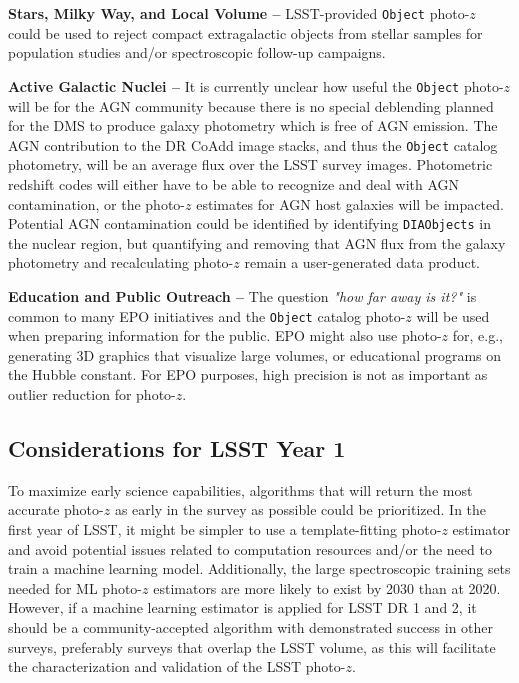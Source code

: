 \documentclass[DM,lsstdraft,toc]{lsstdoc}
\begin{document}
{\bf Stars, Milky Way, and Local Volume --} LSST-provided {\tt Object} photo-$z$ could be used to reject compact extragalactic objects from stellar samples for population studies and/or spectroscopic follow-up campaigns.

{\bf Active Galactic Nuclei --} It is currently unclear how useful the {\tt Object} photo-$z$ will be for the AGN community because there is no special deblending planned for the DMS to produce galaxy photometry which is free of AGN emission.
The AGN contribution to the DR CoAdd image stacks, and thus the {\tt Object} catalog photometry, will be an average flux over the LSST survey images.
Photometric redshift codes will either have to be able to recognize and deal with AGN contamination, or the photo-$z$ estimates for AGN host galaxies will be impacted.
Potential AGN contamination could be identified by identifying {\tt DIAObjects} in the nuclear region, but quantifying and removing that AGN flux from the galaxy photometry and recalculating photo-$z$ remain a user-generated data product.

{\bf Education and Public Outreach --} The question {\it "how far away is it?"} is common to many EPO initiatives and the {\tt Object} catalog photo-$z$ will be used when preparing information for the public.
EPO might also use photo-$z$ for, e.g., generating 3D graphics that visualize large volumes, or educational programs on the Hubble constant.
For EPO purposes, high precision is not as important as outlier reduction for photo-$z$.

\subsection{Considerations for LSST Year 1}\label{ssec:use_LOY1}

To maximize early science capabilities, algorithms that will return the most accurate photo-$z$ as early in the survey as possible could be prioritized.
In the first year of LSST, it might be simpler to use a template-fitting photo-$z$ estimator and avoid potential issues related to computation resources and/or the need to train a machine learning model.
Additionally, the large spectroscopic training sets needed for ML photo-$z$ estimators are more likely to exist by 2030 than at 2020.
However, if a machine learning estimator is applied for LSST DR 1 and 2, it should be a community-accepted algorithm with demonstrated success in other surveys, preferably surveys that overlap the LSST volume, as this will facilitate the characterization and validation of the LSST photo-$z$. 
\end{document}
